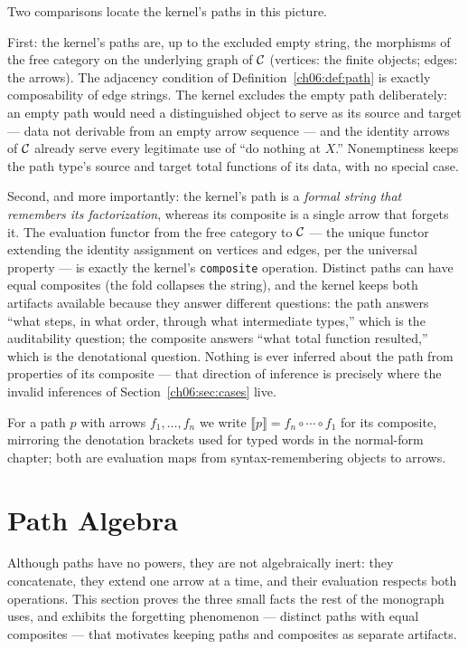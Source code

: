 Two comparisons locate the kernel's paths in this picture.

First: the kernel's paths are, up to the excluded empty string, the
morphisms of the free category on the underlying graph of $\mathcal{C}$ (vertices:
the finite objects; edges: the arrows). The adjacency condition of
Definition~\ref{ch06:def:path} is exactly composability of edge strings.
The kernel excludes the empty path deliberately: an empty path would need
a distinguished object to serve as its source and target --- data not
derivable from an empty arrow sequence --- and the identity arrows of
$\mathcal{C}$ already serve every legitimate use of ``do nothing at $X$.''
Nonemptiness keeps the path type's source and target total functions of
its data, with no special case.

Second, and more importantly: the kernel's path is a \emph{formal string
that remembers its factorization}, whereas its composite is a single arrow
that forgets it. The evaluation functor from the free category to $\mathcal{C}$
--- the unique functor extending the identity assignment on vertices and
edges, per the universal property \cite{maclanecwm} --- is exactly the
kernel's \texttt{composite} operation. Distinct paths can have equal
composites (the fold collapses the string), and the kernel keeps both
artifacts available because they answer different questions: the path
answers ``what steps, in what order, through what intermediate types,''
which is the auditability question; the composite answers ``what total
function resulted,'' which is the denotational question. Nothing is ever
inferred about the path from properties of its composite --- that
direction of inference is precisely where the invalid inferences of
Section~\ref{ch06:sec:cases} live.

\begin{notation}
\label{ch06:not:path}
For a path $p$ with arrows $f_1, \dots, f_n$ we write $\llbracket p
\rrbracket = f_n \circ \cdots \circ f_1$ for its composite, mirroring the
denotation brackets used for typed words in the normal-form chapter; both
are evaluation maps from syntax-remembering objects to arrows.
\end{notation}

\section{Path Algebra}
\label{ch06:sec:algebra}

Although paths have no powers, they are not algebraically inert: they
concatenate, they extend one arrow at a time, and their evaluation
respects both operations. This section proves the three small facts the
rest of the monograph uses, and exhibits the forgetting phenomenon ---
distinct paths with equal composites --- that motivates keeping paths and
composites as separate artifacts.

